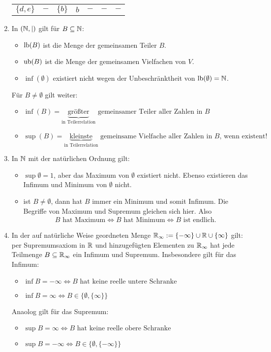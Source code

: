\documentclass[../../main.tex]{subfiles}
\begin{document}
\begin{bsp}
\begin{enumerate}[\normalfont(a)]
\begin{table}[H]
\begin{tabular}{c|c|c|c|c|c|c}
				$\{d,e\}$ & $-$ & $\{b\}$ & $b$ & $-$ & $-$ & $-$
			\end{tabular}
		\end{table}
		\item In $(\mathbb N, \mid)$ gilt für $B\subseteq \mathbb N$:
		\begin{itemize}
			\item $\operatorname{lb}(B)$ ist die Menge der gemeinsamen Teiler $B$.
			\item $\operatorname{ub}(B)$ ist die Menge der gemeinsamen Vielfachen von $V$.
			\item $\inf(\emptyset)$ existiert nicht wegen der Unbeschränktheit von $\operatorname{lb}(\emptyset)=\mathbb N$.
		\end{itemize}
		Für $B\neq \emptyset$ gilt weiter:
		\begin{itemize}
			\item $\inf(B)=\underbrace{\text{größter}}_{\text{in Teilerrelation}} \text{ gemeinsamer Teiler aller Zahlen in }B$
			\item $\sup(B)=\underbrace{\text{kleinste}}_{\text{in Teilerrelation}} \text{ gemeinsame Vielfache aller Zahlen in }B\text{, wenn existent!}$
		\end{itemize}		
		\item In $\mathbb N$ mit der natürlichen Ordnung gilt:
		\begin{itemize}
			\item $\sup\emptyset=1$, aber das Maximum von $\emptyset$ existiert nicht. Ebenso existieren das Infimum und Minimum von $\emptyset$ nicht.
			\item ist $B\neq\emptyset$, dann hat $B$ immer ein Minimum und somit Infimum. Die Begriffe von Maximum und Supremum gleichen sich hier. Also
			\begin{align*}
				B\text{ hat Maximum}\Longleftrightarrow B\text{ hat Minimum}\Longleftrightarrow B\text{ ist endlich}.
			\end{align*}
		\end{itemize}
		\item In der auf natürliche Weise geordneten Menge $\mathbb R_\infty:=\{-\infty\}\cup\mathbb R\cup\{\infty\}$ gilt: per Supremumsaxiom in $\mathbb R$ und hinzugefügten Elementen zu $\mathbb R_\infty$ hat jede Teilmenge $B\subseteq\mathbb R_\infty$ ein Infimum und Supremum. Insbesondere gilt für das Infimum:
		\begin{itemize}
			\item $\inf B=-\infty\Longleftrightarrow B\text{ hat keine reelle untere Schranke}$
			\item $\inf B=\infty\Longleftrightarrow B\in\{\emptyset,\{\infty\}\}$
		\end{itemize}
		Anaolog gilt für das Supremum:
		\begin{itemize}
			\item $\sup B=\infty\Longleftrightarrow B\text{ hat keine reelle obere Schranke}$
			\item $\sup B=-\infty\Longleftrightarrow B\in\{\emptyset,\{-\infty\}\}$
		\end{itemize}
	\end{enumerate}
\end{bsp}
\end{document}
